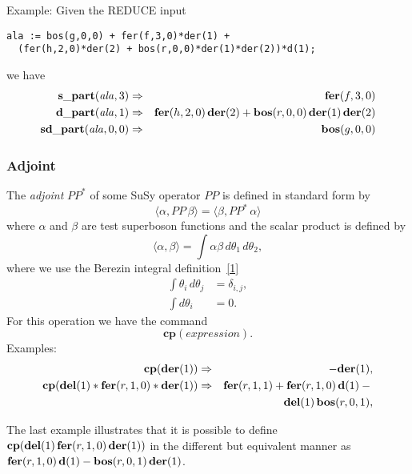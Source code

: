 {Example: Given the REDUCE input
\begin{verbatim}
ala := bos(g,0,0) + fer(f,3,0)*der(1) +
  (fer(h,2,0)*der(2) + bos(r,0,0)*der(1)*der(2))*d(1);
\end{verbatim}
we have
\begin{eqnarray*}
  \mathbf{s\_part}(\mathit{ala},3) &\Rightarrow& \mathbf{fer}(f,3,0) \\
  \mathbf{d\_part}(\mathit{ala},1) &\Rightarrow& \mathbf{fer}(h,2,0)\,\mathbf{der}(2) +
  \mathbf{bos}(r,0,0)\,\mathbf{der}(1)\,\mathbf{der}(2) \\
  \mathbf{sd\_part}(\mathit{ala},0,0) &\Rightarrow& \mathbf{bos}(g,0,0)
\end{eqnarray*}

\subsubsection*{Adjoint}

The \emph{adjoint} $\mathit{PP}^*$ of some SuSy operator $\mathit{PP}$
is defined in standard form by
\begin{equation*}
  \langle \alpha, \mathit{PP}\,\beta \rangle =
  \langle \beta, \mathit{PP}^*\,\alpha \rangle
\end{equation*}
where $\alpha$ and $\beta$ are test superboson functions and the
scalar product is defined by
\begin{equation*}
  \langle \alpha, \beta \rangle =
  \int \alpha \beta\,d\theta_{1}\,d\theta_{2},
\end{equation*}
where we use the Berezin integral definition~\hyperlink{susy2-bib}{[1]}
\begin{align*}
  \int \theta_{i}\,d\theta_{j} &= \delta_{i,j}, \\
  \int d\theta_{i} &= 0.
\end{align*}
For this operation we have the command
\begin{equation*}
  \mathbf{cp}(\mathit{expression}).
\end{equation*}
Examples:
\begin{eqnarray*}
  \mathbf{cp}(\mathbf{der}(1)) &\Rightarrow& -\mathbf{der}(1), \\
  \mathbf{cp}(\mathbf{del}(1)*\mathbf{fer}(r,1,0)*\mathbf{der}(1)) &\Rightarrow&
  \mathbf{fer}(r,1,1) + \mathbf{fer}(r,1,0)\,\mathbf{d}(1) - \mbox{}\\
  && \mathbf{del}(1)\,\mathbf{bos}(r,0,1),
\end{eqnarray*}

The last example illustrates that it is possible to define
$\mathbf{cp}(\mathbf{del}(1)\,\mathbf{fer}(r,1,0)\,\mathbf{der}(1))$ in the different but
equivalent manner as $\mathbf{fer}(r,1,0)\,\mathbf{d}(1) - \mathbf{bos}(r,0,1)\,\mathbf{der}(1)$.

}
